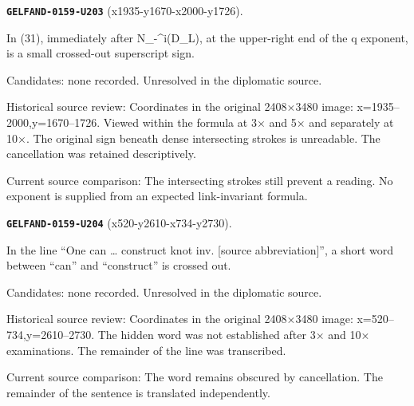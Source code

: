 \par\noindent\leavevmode{}\label{GELFAND-0159-U203}\label{GELFAND-P001467:x1935-y1670-x2000-y1726}\textbf{\texttt{GELFAND-0159-U203}} (x1935-y1670-x2000-y1726).\nopagebreak[4]\par
In (31), immediately after N\_-\textasciicircum{}i(D\_L), at the upper-right end of the q exponent, is a small crossed-out superscript sign.\par
Candidates: none recorded. Unresolved in the diplomatic source.\par
Historical source review: Coordinates in the original 2408×3480 image: x=1935–2000,y=1670–1726. Viewed within the formula at 3× and 5× and separately at 10×. The original sign beneath dense intersecting strokes is unreadable. The cancellation was retained descriptively.\par
Current source comparison: The intersecting strokes still prevent a reading. No exponent is supplied from an expected link-invariant formula.\par\medskip
\par\noindent\leavevmode{}\label{GELFAND-0159-U204}\label{GELFAND-P001467:x520-y2610-x734-y2730}\textbf{\texttt{GELFAND-0159-U204}} (x520-y2610-x734-y2730).\nopagebreak[4]\par
In the line “One can … construct knot inv. [source abbreviation]”, a short word between “can” and “construct” is crossed out.\par
Candidates: none recorded. Unresolved in the diplomatic source.\par
Historical source review: Coordinates in the original 2408×3480 image: x=520–734,y=2610–2730. The hidden word was not established after 3× and 10× examinations. The remainder of the line was transcribed.\par
Current source comparison: The word remains obscured by cancellation. The remainder of the sentence is translated independently.\par\medskip
